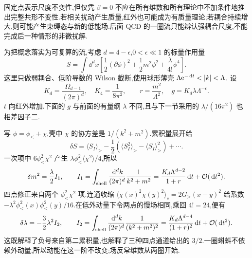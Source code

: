 固定点表示尺度不变性,但仅凭 $\beta=0$ 不应在所有维数和所有理论中不加条件地推出完整共形不变性.若相关扰动产生质量,红外也可能成为有质量理论;若耦合持续增大,则可能产生束缚态与新的低能场.后面 QCD 的一圈流只能辨认强耦合尺度,不能完成后一种情形的非微扰解.


为把概念落实为可复算的流,考虑 $d=4-\epsilon$,$0<\epsilon\ll1$ 的标量作用量
\begin{equation}
 S=\int\dd^dx\left[\frac12(\partial\phi)^2+
              \frac12m^2\phi^2+\frac\lambda{4!}\phi^4\right].
\end{equation}
这里只做弱耦合、低阶导数的 Wilson 截断,使用球形薄壳
$\Lambda\e^{-\dd t}<|k|<\Lambda$.
设
\begin{equation}
 K_d=\frac{\Omega_{d-1}}{(2\pi)^d},\quad K_4=\frac1{8\pi^2},
 \qquad r=\frac{m^2}{\Lambda^2},\quad
 g=K_d\lambda\Lambda^{-\epsilon}.
 \label{eq:phi4-shell-normalization}
\end{equation}
$t$ 向红外增加.下面的 $g$ 与前面的有量纲 $\lambda$ 不同,且与下一节采用的 $\lambda/(16\pi^2)$ 也相差因子二.

写 $\phi=\phi_<+\chi$,壳中 $\chi$ 的协方差是 $1/(k^2+m^2)$.累积量展开给
\begin{equation}
 \delta S=\langle S_I\rangle_>
   -\frac12\left(\langle S_I^2\rangle_>
                    -\langle S_I\rangle_>^2\right)+\cdots.
\end{equation}
一次项中 $6\phi_<^2\chi^2$ 产生 $\lambda\phi_<^2\langle\chi^2\rangle/4$,所以
\begin{equation}
 \delta m^2=\frac\lambda2 I_1,\qquad
 I_1=\int_{\rm shell}\frac{\,\mathrm d^dk}{(2\pi)^d}\frac1{k^2+m^2}
    =\frac{K_d\Lambda^{d-2}}{1+r}\,\mathrm d t+\mathcal O(\,\mathrm d t^2).
\end{equation}
四点修正来自两个 $\phi_<^2\chi^2$ 项.连通收缩
$\langle\chi(x)^2\chi(y)^2\rangle_c=2G_>(x-y)^2$ 给系数
$-\lambda^2\phi_<^2(x)\phi_<^2(y)/16$.在低外动量下令两点的慢场相同,乘回 $4!=24$,便有
\begin{equation}
 \delta\lambda=-\frac32\lambda^2I_2,\qquad
 I_2=\int_{\rm shell}\frac{\,\mathrm d^dk}{(2\pi)^d}\frac1{(k^2+m^2)^2}
 =\frac{K_d\Lambda^{d-4}}{(1+r)^2}\,\mathrm d t+\mathcal O(\,\mathrm d t^2).
\end{equation}
这既解释了负号来自第二累积量,也解释了三种四点通道给出的 $3/2$.一圈蝌蚪不依赖外动量,所以动能在这一阶不改变;场反常维数从两圈开始.

